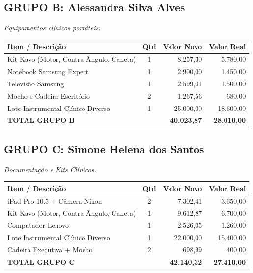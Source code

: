 \documentclass[12pt, a4paper]{article}
\begin{document}
\subsection*{GRUPO B: Alessandra Silva Alves}
\textit{Equipamentos clínicos portáteis.}
\begin{longtable}{>{\raggedright\arraybackslash}p{8cm} c r r}
    \toprule
    \rowcolor{tableHeader} \textbf{Item / Descrição} & \textbf{Qtd} & \textbf{Valor Novo} & \textbf{Valor Real} \\
    \midrule
    \endhead
    Kit Kavo (Motor, Contra Ângulo, Caneta) & 1 & 8.257,30 & 5.780,00 \\
    Notebook Samsung Expert & 1 & 2.900,00 & 1.450,00 \\
    Televisão Samsung & 1 & 2.599,01 & 1.500,00 \\
    Mocho e Cadeira Escritório & 2 & 1.267,56 & 680,00 \\
    Lote Instrumental Clínico Diverso & 1 & 25.000,00 & 18.600,00 \\
    \midrule
    \rowcolor{lightGray} \textbf{TOTAL GRUPO B} & & \textbf{40.023,87} & \textbf{28.010,00} \\
    \bottomrule
\end{longtable}
\newpage

\subsection*{GRUPO C: Simone Helena dos Santos}
\textit{Documentação e Kits Clínicos.}
\begin{longtable}{>{\raggedright\arraybackslash}p{8cm} c r r}
    \toprule
    \rowcolor{tableHeader} \textbf{Item / Descrição} & \textbf{Qtd} & \textbf{Valor Novo} & \textbf{Valor Real} \\
    \midrule
    \endhead
    iPad Pro 10.5 + Câmera Nikon & 2 & 7.302,41 & 3.650,00 \\
    Kit Kavo (Motor, Contra Ângulo, Caneta) & 1 & 9.612,87 & 6.700,00 \\
    Computador Lenovo & 1 & 2.526,05 & 1.260,00 \\
    Lote Instrumental Clínico Diverso & 1 & 22.000,00 & 15.400,00 \\
    Cadeira Executiva + Mocho & 2 & 698,99 & 400,00 \\
    \midrule
    \rowcolor{lightGray} \textbf{TOTAL GRUPO C} & & \textbf{42.140,32} & \textbf{27.410,00} \\
    \bottomrule
\end{longtable}
\end{document}
